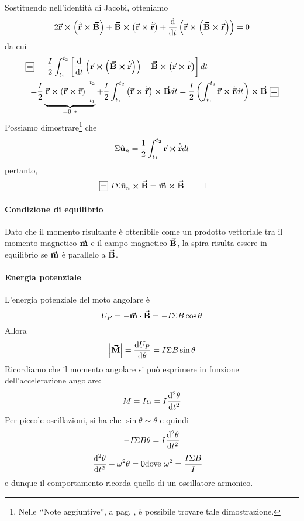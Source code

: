\begin{demonstration}
	Sostituendo nell'identità di Jacobi, otteniamo
	\begin{equation*}
		2\vb*{\va{r}}\cross\left(\dot{\vec{\mathbf{r}}}\cross\vb*{\va{B}}\right)+\vb*{\va{B}}\cross\left(\vb*{\va{r}}\cross\dot{\vec{\mathbf{r}}}\right)+\dv{t}\left(\vb*{\va{r}}\cross\left(\vb*{\va{B}}\cross\vb*{\va{r}}\right)\right)=0
	\end{equation*}
	da cui
	\begin{align*}
		\squarequal& -\frac{I}{2}\int_{t_1}^{t_2}\left[\dv{t}\left(\vba{r}\cross\left(\vba{B}\cross\vbd{r}\right)\right)-\vba{B}\cross\left(\vba{r}\cross\vbd{r}\right)\right]dt\\
		=&\frac{I}{2}\underbrace{\eval{\vba{r}\cross\left(\vba{r}\cross\vba{r}\right)}_{t_1}^{t_2}}_{=0\ \ast}+\frac{I}{2}\int_{t_1}^{t_2}\left(\vba{r}\cross\vbd{r}\right)\cross\vba{B}dt=\frac{I}{2}\left(\int_{t_1}^{t_2}\vba{r}\cross\vbd{r}dt\right)\cross\vba{B}\squarequal
	\end{align*}
	Possiamo dimostrare\footnote{Nelle ‘‘Note aggiuntive'', a pag. \pageref{AreaCurvaDelimitata}, è possibile trovare tale dimostrazione.} che
	\begin{equation*}
		\Sigma\hat{\mathbf{u}}_n=\frac{1}{2}\int_{t_1}^{t_2}\vb*{\va{r}}\cross\dot{\vec{\mathbf{r}}}dt
	\end{equation*}
pertanto,
\begin{equation*}
	\squarequal I\Sigma\vbh{u}_n\cross \vba{B}=\vba{m}\cross\vba{B}\qedhere
\end{equation*}
\end{demonstration}
\paragraph{Condizione di equilibrio}
Dato che il momento risultante è ottenibile come un prodotto vettoriale tra il momento magnetico $\vb*{\va{m}}$ e il campo magnetico $\vb*{\va{B}}$, la spira risulta essere in equilibrio se $\vb*{\va{m}}$ è parallelo a $\vb*{\va{B}}$.
\paragraph{Energia potenziale}
L'energia potenziale del moto angolare è
\begin{equation}
	U_P=-\vba{m}\vdot\vba{B}=-I\Sigma B\cos\theta
\end{equation}
Allora
\begin{equation}
	\abs{\vb*{\va{M}}}=\dv{U_P}{\theta}=I\Sigma B\sin\theta
\end{equation}\label{EnergiaPotenzialeCasoGeneralemanontroppo}
Ricordiamo che il momento angolare si può esprimere in funzione dell'accelerazione angolare:
\begin{equation}
	M=I\alpha=I\dv[2]{\theta}{t}
\end{equation}
Per piccole oscillazioni, si ha che $\sin\theta\sim\theta$ e quindi
\begin{equation*}
	-I\Sigma B\theta=I\dv[2]{\theta}{t}
\end{equation*}
\begin{align}
	\dv[2]{\theta}{t}+\omega^2\theta=0&\text{dove}\ \omega^2=\frac{I\Sigma B}{I}
\end{align}
e dunque il comportamento ricorda quello di un oscillatore armonico.
